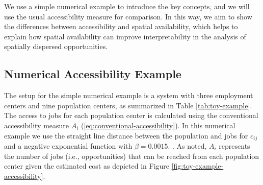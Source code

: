 \documentclass[]{elsarticle} %
\begin{document}
We use a simple numerical example to introduce the key concepts, and we
will use the usual accessibility measure for comparison. In this way, we
aim to show the differences between accessibility and spatial
availability, which helps to explain how spatial availability can
improve interpretability in the analysis of spatially dispersed
opportunities.

\hypertarget{accessibility-numerical-example}{%
\subsection{Numerical Accessibility
Example}\label{accessibility-numerical-example}}

The setup for the simple numerical example is a system with three
employment centers and nine population centers, as summarized in Table
\ref{tab:toy-example}. The access to jobs for each population center is
calculated using the conventional accessibility measure \(A_i\)
(\ref{eq:conventional-accessibility}). In this numerical example we use
the straight line distance between the population and jobs for
\(c_{ij}\) and a negative exponential function with \(\beta = 0.0015\).
. As noted, \(A_i\) represents the number of jobs (i.e., opportunities)
that can be reached from each population center given the estimated cost
as depicted in Figure \ref{fig:toy-example-accessibility}.
\end{document}
